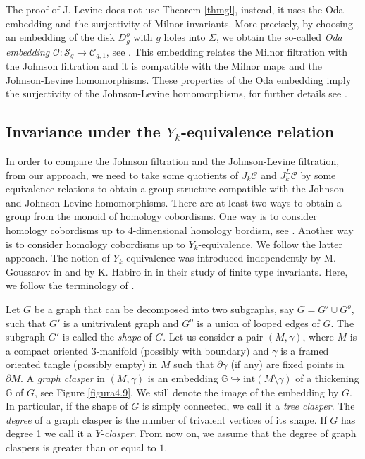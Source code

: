 \documentclass[10pt]{amsart}
\numberwithin{equation}{section}
\numberwithin{equation}{section}
\theoremstyle{definition}
\begin{document}
The proof of J. Levine does not use Theorem \ref{thmgl}, instead, it uses the Oda embedding \cite{oda1992lower} and the surjectivity of Milnor invariants. More precisely, by choosing an  embedding of the disk $D_g^o$ with $g$ holes into $\Sigma$, we obtain the so-called \emph{Oda embedding} $\mathcal{O}:\mathcal{S}_g\longrightarrow \mathcal{C}_{g,1}$, see \cite[Section 3.2]{MR1823501}. This embedding relates the Milnor filtration with the Johnson filtration and it is compatible with the Milnor maps and the Johnson-Levine homomorphisms. These properties of the Oda embedding imply the surjectivity of the Johnson-Levine homomorphisms, for further details see \cite[Theorem 8]{MR1823501}.

\subsection{Invariance under the   \texorpdfstring{$Y_k$}{}-equivalence relation}\label{seccion4.2} In order to compare the Johnson filtration and the Johnson-Levine filtration, from our approach, we need to take some quotients of $J_k\mathcal{C}$ and $J_k^L\mathcal{C}$ by some equivalence relations to obtain a group structure compatible with the Johnson and Johnson-Levine homomorphisms. There are  at least two  ways to obtain a group from the monoid of homology cobordisms. One way is to consider homology cobordisms up to  4-dimensional homology bordism, see \cite{MR1823501,MR2131016}. Another way is to consider homology cobordisms up to $Y_k$-equivalence. We follow the latter approach. The notion of $Y_k$-equivalence was introduced independently by  M. Goussarov in \cite{MR1715131,MR1793618}  and by K. Habiro in \cite{MR1735632} in their study of finite type invariants. Here, we follow the terminology of  \cite{MR1735632}.

Let $G$ be a graph that can be decomposed into two subgraphs, say  $G=G'\cup G^o$, such that $G'$ is a unitrivalent graph and $G^o$ is a union of looped edges of $G$. The subgraph $G'$ is called the \emph{shape} of $G$. Let us consider a pair $(M,\gamma)$, where $M$ is a compact oriented $3$-manifold (possibly with boundary) and $\gamma$ is a framed oriented tangle (possibly empty)  in $M$ such that $\partial\gamma$ (if any) are fixed points in $\partial M$. A \emph{graph clasper} in $(M,\gamma)$ is an embedding $\mathbb{G}\hookrightarrow \text{int}(M\setminus\gamma)$ of a thickening $\mathbb{G}$ of $G$, see Figure \ref{figura4.9}. We still denote the image of the embedding by $G$. In particular, if the shape  of $G$ is simply connected, we call it a \emph{tree clasper}. The \emph{degree} of a  graph clasper is the number of trivalent vertices of its shape. If $G$ has degree 1 we call it a $Y$-\emph{clasper}. From now on, we assume that the degree of  graph claspers is greater than or equal to $1$.
\end{document}
